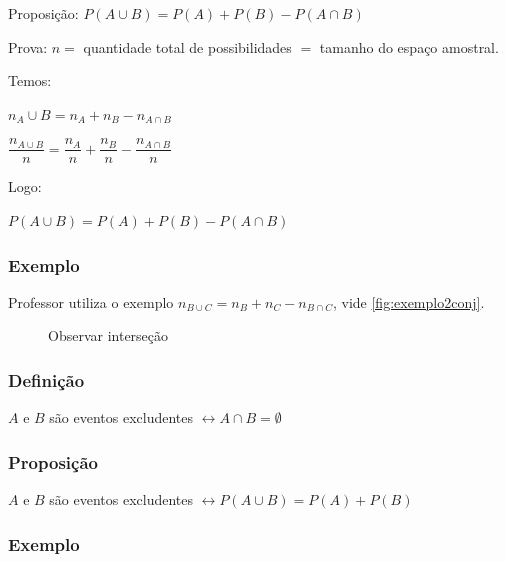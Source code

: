 \documentclass[a4paper]{article}
\begin{document}
	Proposição: $P(A \cup B) = P(A) + P(B) - P(A \cap B)$
	
	Prova: $n =$ quantidade total de possibilidades $=$ tamanho do espaço amostral.
	
	Temos:
	
	$n_A\cup B = n_A + n_B - n_{A \cap B}$
	
	$\dfrac{n_{A\cup B}}{n} = \dfrac{n_{A}}{n} + \dfrac{n_B}{n} - \dfrac{n_{A \cap B}}{n}$

	Logo:
	
	$P(A \cup B) = P(A) + P(B) - P(A \cap B)$
	
	\subsubsection{Exemplo}
	
	Professor utiliza o exemplo $n_{B \cup C} = n_{B} + n_{C} - n_{B \cap C}$, vide \autoref{fig:exemplo2conj}.
	
	\begin{figure}[h]
		\centering
		\caption{Observar interseção}
		\label{fig:exemplo2conj}
	\end{figure}
	
	\subsubsection{Definição}
	
	$A$ e $B$ são eventos excludentes \hspace{5mm} $\leftrightarrow A \cap B = \emptyset$
	
	\subsubsection{Proposição}
	
	$A$ e $B$ são eventos excludentes \hspace{5mm} $\leftrightarrow P(A \cup B) = P(A) + P(B)$
	
	\subsubsection{Exemplo}
	
\end{document}
